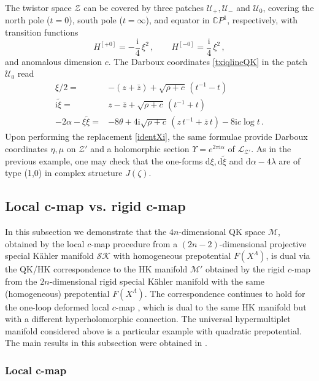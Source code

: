 \documentclass[12pt,reqno]{article}
\numberwithin{equation}{section}
\newcommand{\be}{\begin{equation}}
\newcommand{\ee}{\end{equation}}
\def\({\left(}
\def\){\right)}
\def\bz{\bar z}
\newcommand{\CP}{\IC P^1}
\newcommand{\de}{\mathrm{d}}
\newcommand{\I}{\mathrm{i}}
\newcommand{\cS}{\mathcal{S}}
\newcommand{\cK}{\mathcal{K}}
\newcommand{\cM}{\mathcal{M}}
\newcommand{\cU}{\mathcal{U}}
\newcommand{\cZ}{\mathcal{Z}}
\newcommand{\IC}{\mathbb{C}}
\newcommand{\lb}{\mathscr{L}}
\def\Hij#1{H^{[#1]}}
\newcommand{\txi}{\tilde\xi}
\newcommand{\kahler}{{K\"ahler}\xspace}
\def\varpiqk{t}
\def\varpihk{\zeta}
\def\sigp{{\theta}}
\def\pcM{\cM'}
\def\pcZ{\cZ'}
\numberwithin{equation}{section}
\begin{document}
The twistor space $\cZ$ can be covered by three patches $\cU_+,\cU_-$ and $\cU_0$,
covering the north pole ($\varpiqk=0$), south pole ($\varpiqk=\infty$), and equator in $\CP$,
respectively, with transition
functions \cite{Alexandrov:2008nk,Alexandrov:2009vj}
\be
\Hij{+0}=-\frac{\I}{4}\,\xi^2\, ,
\qquad
\Hij{-0}=\frac{\I}{4}\,\xi^2\, ,
\ee
and anomalous dimension $c$. The Darboux
coordinates \eqref{txiqlineQK} in the patch $\cU_0$ read
\be
\begin{split}
\xi/2 =& -(z+\bz)+\sqrt{\rho+c} \, \(\varpiqk^{-1}  -  \varpiqk \)\\
\I\txi =& z-\bz+\sqrt{\rho+c} \, \( \varpiqk^{-1}  +  \varpiqk \) \\
-2\alpha-\xi\txi=&-8\sigp + 4\I \sqrt{\rho+c} \, \( z \, \varpiqk^{-1}  +  \bz \, \varpiqk \)
- 8\I c  \log t\, .
\end{split}
\ee
Upon performing the replacement \eqref{identXi}, the same formulae
provide Darboux coordinates $\eta,\mu$ on $\pcZ$ and a holomorphic section
$\Upsilon=e^{2\pi\I\alpha}$ of $\lb_{\pcZ}$. As in the previous example, one may check
that the one-forms $\de\xi, \de\txi$ and $\de\alpha-4\lambda$ are of type (1,0) in complex
structure $J(\varpihk)$.





\subsection{Local c-map vs. rigid c-map}
\label{cmap}

In this subsection we demonstrate that the $4n$-dimensional QK space $\cM$,
 obtained by the local $c$-map
procedure \cite{Ferrara:1989ik} from a $(2n-2)$-dimensional projective special \kahler manifold
$\cS\cK$
with homogeneous prepotential $F(X^\Lambda)$, is dual via the QK/HK correspondence
to the HK manifold $\pcM$ obtained by the rigid $c$-map \cite{Cecotti:1988qn} from
the $2n$-dimensional rigid special \kahler manifold with the same (homogeneous)
prepotential $F(X^\Lambda)$. The correspondence continues to hold for the
one-loop deformed local $c$-map \cite{Alexandrov:2007ec,Alexandrov:2008nk},
which is dual to the same HK manifold but with a different hyperholomorphic connection.
The universal hypermultiplet manifold considered above is a particular
example with quadratic prepotential. The main results in this subsection
were obtained in \cite{BPNeitzke}.

\subsubsection{Local c-map}
\label{localcmap}
\end{document}
